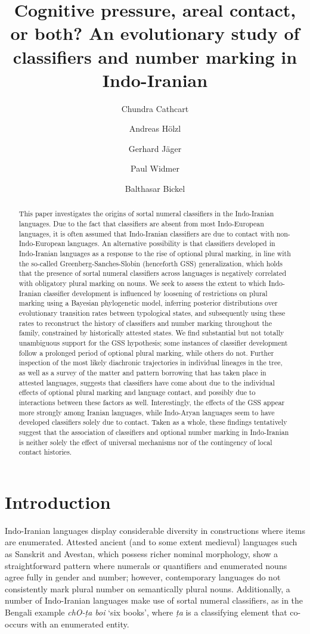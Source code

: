 \documentclass[11pt]{article}
\title{Cognitive pressure, areal contact, or both? An evolutionary study of classifiers and number marking in Indo-Iranian}
\author[1,2]{Chundra Cathcart}
\author[1,2]{Andreas H\"olzl}
\author[2]{Gerhard J\"ager}
\author[1,2]{Paul Widmer}
\author[1,2]{Balthasar Bickel}
\affil[1]{Department of Comparative Language Sciences, University of Zurich}
\affil[2]{Center for the Interdisciplinary Study of Language Evolution, University of Zurich}
\affil[3]{Department of Linguistics, University of T\"ubingen}
\date{}
\begin{document}
\maketitle
\sloppy

\begin{abstract}
\noindent This paper investigates the origins of sortal numeral classifiers in the Indo-Iranian languages. 
Due to the fact that classifiers are absent from most Indo-European languages, it is often assumed that Indo-Iranian classifiers are due to contact with non-Indo-European languages. 
An alternative possibility is that classifiers developed in Indo-Iranian languages as a response to the rise of optional plural marking, in line with the so-called Greenberg-Sanches-Slobin (henceforth GSS) generalization, which holds that the presence of sortal numeral classifiers across languages is negatively correlated with obligatory plural marking on nouns. 
We seek to assess the extent to which Indo-Iranian classifier development is influenced by loosening of restrictions on plural marking using a Bayesian phylogenetic model, inferring posterior distributions over evolutionary transition rates between typological states, and subsequently using these rates to reconstruct the history of classifiers and number marking throughout the family, constrained by historically attested states. 
We find substantial but not totally unambiguous support for the GSS hypothesis; some instances of classifier development follow a prolonged period of optional plural marking, while others do not. 
Further inspection of the most likely diachronic trajectories in individual lineages in the tree, as well as a survey of the matter and pattern borrowing that has taken place in attested languages, suggests that classifiers have come about due to the individual effects of optional plural marking and language contact, and possibly due to interactions between these factors as well. 
Interestingly, the effects of the GSS appear more strongly among Iranian languages, while Indo-Aryan languages seem to have developed classifiers solely due to contact. 
Taken as a whole, these findings tentatively suggest that the association of classifiers and optional number marking in Indo-Iranian is neither solely the effect of universal mechanisms nor of the contingency of local contact histories. 
\end{abstract}

\section{Introduction}
Indo-Iranian languages display considerable diversity in constructions where items are enumerated. 
Attested ancient (and to some extent medieval) languages such as Sanskrit and Avestan, which possess richer nominal morphology,  show a straightforward pattern where numerals or quantifiers and enumerated nouns agree fully in gender and number; however, contemporary languages do not consistently mark plural number on semantically plural nouns. 
Additionally, a number of Indo-Iranian languages make use of sortal numeral classifiers, as in the Bengali example {\it ch{\IPA O}-\d{t}a boi} `six books', where {\it \d{t}a} is a classifying element that co-occurs with an enumerated entity. 
\end{document}
